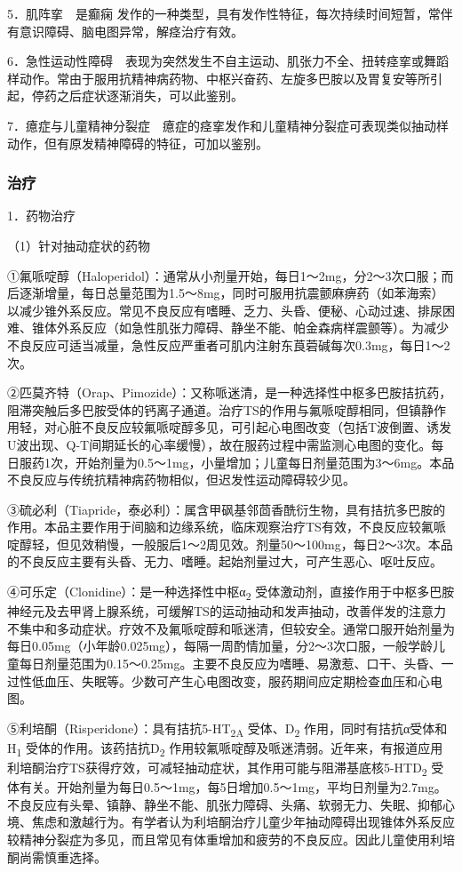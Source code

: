 5．肌阵挛　是癫痫
发作的一种类型，具有发作性特征，每次持续时间短暂，常伴有意识障碍、脑电图异常，解痉治疗有效。

6．急性运动性障碍　表现为突然发生不自主运动、肌张力不全、扭转痉挛或舞蹈样动作。常由于服用抗精神病药物、中枢兴奋药、左旋多巴胺以及胃复安等所引起，停药之后症状逐渐消失，可以此鉴别。

7．癔症与儿童精神分裂症　癔症的痉挛发作和儿童精神分裂症可表现类似抽动样动作，但有原发精神障碍的特征，可加以鉴别。

\subsubsection{治疗}

1．药物治疗

（1）针对抽动症状的药物

①氟哌啶醇（Haloperidol）：通常从小剂量开始，每日1～2mg，分2～3次口服；而后逐渐增量，每日总量范围为1.5～8mg，同时可服用抗震颤麻痹药（如苯海索）以减少锥外系反应。常见不良反应有嗜睡、乏力、头昏、便秘、心动过速、排尿困难、锥体外系反应（如急性肌张力障碍、静坐不能、帕金森病样震颤等）。为减少不良反应可适当减量，急性反应严重者可肌内注射东莨菪碱每次0.3mg，每日1～2次。

②匹莫齐特（Orap、Pimozide）：又称哌迷清，是一种选择性中枢多巴胺拮抗药，阻滞突触后多巴胺受体的钙离子通道。治疗TS的作用与氟哌啶醇相同，但镇静作用轻，对心脏不良反应较氟哌啶醇多见，可引起心电图改变（包括T波倒置、诱发U波出现、Q-T间期延长的心率缓慢），故在服药过程中需监测心电图的变化。每日服药1次，开始剂量为0.5～1mg，小量增加；儿童每日剂量范围为3～6mg。本品不良反应与传统抗精神病药物相似，但迟发性运动障碍较少见。

③硫必利（Tiapride，泰必利）：属含甲砜基邻茴香酰衍生物，具有拮抗多巴胺的作用。本品主要作用于间脑和边缘系统，临床观察治疗TS有效，不良反应较氟哌啶醇轻，但见效稍慢，一般服后1～2周见效。剂量50～100mg，每日2～3次。本品的不良反应主要有头昏、无力、嗜睡。起始剂量过大，可产生恶心、呕吐反应。

④可乐定（Clonidine）：是一种选择性中枢α\textsubscript{2}
受体激动剂，直接作用于中枢多巴胺神经元及去甲肾上腺系统，可缓解TS的运动抽动和发声抽动，改善伴发的注意力不集中和多动症状。疗效不及氟哌啶醇和哌迷清，但较安全。通常口服开始剂量为每日0.05mg（小年龄0.025mg），每隔一周酌情加量，分2～3次口服，一般学龄儿童每日剂量范围为0.15～0.25mg。主要不良反应为嗜睡、易激惹、口干、头昏、一过性低血压、失眠等。少数可产生心电图改变，服药期间应定期检查血压和心电图。

⑤利培酮（Risperidone）：具有拮抗5-HT\textsubscript{2A}
受体、D\textsubscript{2} 作用，同时有拮抗α受体和H\textsubscript{1}
受体的作用。该药拮抗D\textsubscript{2}
作用较氟哌啶醇及哌迷清弱。近年来，有报道应用利培酮治疗TS获得疗效，可减轻抽动症状，其作用可能与阻滞基底核5-HTD\textsubscript{2}
受体有关。开始剂量为每日0.5～1mg，每5日增加0.5～1mg，平均日剂量为2.7mg。不良反应有头晕、镇静、静坐不能、肌张力障碍、头痛、软弱无力、失眠、抑郁心境、焦虑和激越行为。有学者认为利培酮治疗儿童少年抽动障碍出现锥体外系反应较精神分裂症为多见，而且常见有体重增加和疲劳的不良反应。因此儿童使用利培酮尚需慎重选择。

